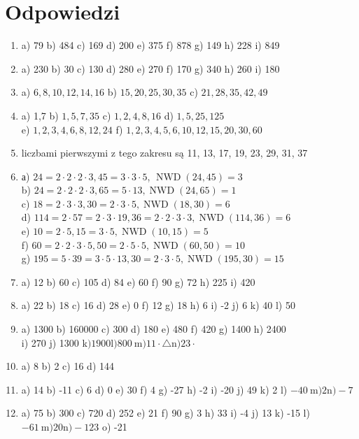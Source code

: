 \documentclass[10pt]{article}
\begin{document}
\section*{Odpowiedzi}
\begin{enumerate}
  \item a) 79 b) 484 c) 169 d) 200 e) 375 f) 878 g) 149 h) 228 i) 849
  \item a) 230 b) 30 c) 130 d) 280 e) 270 f) 170 g) 340 h) 260 i) 180
  \item a) \(6,8,10,12,14,16\) b) \(15,20,25,30,35\) c) \(21,28,35,42,49\)
  \item a) 1,7 b) \(1,5,7,35\) c) \(1,2,4,8,16\) d) \(1,5,25,125\)\\
e) \(1,2,3,4,6,8,12,24\) f) \(1,2,3,4,5,6,10,12,15,20,30,60\)
  \item liczbami pierwszymi z tego zakresu są 11, 13, 17, 19, 23, 29, 31, 37
  \item а) \(24=2 \cdot 2 \cdot 2 \cdot 3,45=3 \cdot 3 \cdot 5\), \(\operatorname{NWD}(24,45)=3\)\\
b) \(24=2 \cdot 2 \cdot 2 \cdot 3,65=5 \cdot 13, \operatorname{NWD}(24,65)=1\)\\
c) \(18=2 \cdot 3 \cdot 3,30=2 \cdot 3 \cdot 5, \operatorname{NWD}(18,30)=6\)\\
d) \(114=2 \cdot 57=2 \cdot 3 \cdot 19,36=2 \cdot 2 \cdot 3 \cdot 3, \operatorname{NWD}(114,36)=6\)\\
e) \(10=2 \cdot 5,15=3 \cdot 5, \operatorname{NWD}(10,15)=5\)\\
f) \(60=2 \cdot 2 \cdot 3 \cdot 5,50=2 \cdot 5 \cdot 5, \operatorname{NWD}(60,50)=10\)\\
g) \(195=5 \cdot 39=3 \cdot 5 \cdot 13,30=2 \cdot 3 \cdot 5, \operatorname{NWD}(195,30)=15\)
  \item a) 12 b) 60 c) 105 d) 84 e) 60 f) 90 g) 72 h) 225 i) 420
  \item a) 22 b) 18 c) 16 d) 28 e) 0 f) 12 g) 18 h) 6 i) -2 j) 6 k) 40 l) 50
  \item a) 1300 b) 160000 c) 300 d) 180 e) 480 f) 420 g) 1400 h) 2400\\
i) 270 j) 1300 k\() 1900 \mathrm{l}) 800 \mathrm{~m}) 11 \cdot \triangle \mathrm{n}) 23 \cdot\)
  \item a) 8 b) 2 c) 16 d) 144
  \item a) 14 b) -11 c) 6 d) 0 e) 30 f) 4 g) -27 h) -2 i) -20 j) 49 k) 2 l) \(-40 \mathrm{~m}) 2 \mathrm{n})-7\)
  \item a) 75 b) 300 c) 720 d) 252 e) 21 f) 90 g) 3 h) 33 i) -4 j) 13 k) -15 l) \(-61 \mathrm{~m}) 20 \mathrm{n})-123\) o) -21

\end{enumerate}
\end{document}
